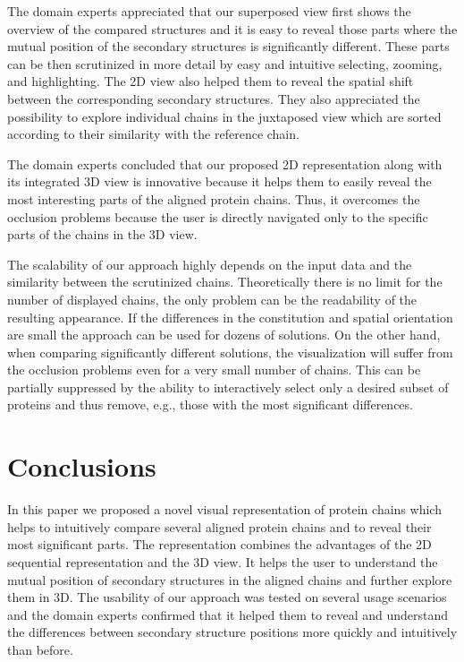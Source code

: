\documentclass[twocolumn]{bmcart}%
\begin{document}
The domain experts appreciated that our superposed view first shows the overview of the compared structures and it is easy to reveal those parts where the mutual position of the secondary structures is significantly different.
These parts can be then scrutinized in more detail by easy and intuitive selecting, zooming, and highlighting.
The 2D view also helped them to reveal the spatial shift between the corresponding secondary structures.
They also appreciated the possibility to explore individual chains in the juxtaposed view which are sorted according to their similarity with the reference chain.

The domain experts concluded that our proposed 2D representation along with its integrated 3D view is innovative because it helps them to easily reveal the most interesting parts of the aligned protein chains.
Thus, it overcomes the occlusion problems because the user is directly navigated only to the specific parts of the chains in the 3D view.

The scalability of our approach highly depends on the input data and the similarity between the scrutinized chains.
Theoretically there is no limit for the number of displayed chains, the only problem can be the readability of the resulting appearance.
If the differences in the constitution and spatial orientation are small the approach can be used for dozens of solutions.
On the other hand, when comparing significantly different solutions, the visualization will suffer from the occlusion problems even for a very small number of chains.
This can be partially suppressed by the ability to interactively select only a desired subset of proteins and thus remove, e.g., those with the most significant differences.

\section*{Conclusions}
In this paper we proposed a novel visual representation of protein chains which helps to intuitively compare several aligned protein chains and to reveal their most significant parts.
The representation combines the advantages of the 2D sequential representation and the 3D view. 
It helps the user to understand the mutual position of secondary structures in the aligned chains and further explore them in 3D.
The usability of our approach was tested on several usage scenarios and the domain experts confirmed that it helped them to reveal and understand the differences between secondary structure positions more quickly and intuitively than before.
\end{document}
